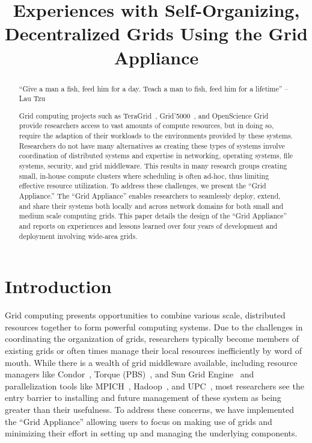 \documentclass[conference]{IEEEtran}
\begin{document}
\title{Experiences with Self-Organizing, Decentralized Grids Using the Grid
Appliance}

\author{
}

\maketitle


\begin{abstract}

``Give a man a fish, feed him for a day.  Teach a man to fish, feed him for a
lifetime'' -- Lau Tzu

Grid computing projects such as TeraGrid~\cite{teragrid},
Grid'5000~\cite{grid_5000}, and OpenScience Grid~\cite{osg} provide researchers
access to vast amounts of compute resources, but in doing so, require the
adaption of their workloads to the environments provided by these systems.
Researchers do not have many alternatives as creating these types of systems
involve coordination of distributed systems and expertise in networking,
operating systems, file systems, security, and grid middleware.  This results
in many research groups creating small, in-house compute clusters where
scheduling is often ad-hoc, thus limiting effective resource utilization.  To
address these challenges, we present the ``Grid Appliance.''  The ``Grid
Appliance'' enables researchers to seamlessly deploy, extend, and share their
systems both locally and across network domains for both small and medium scale
computing grids.  This paper details the design of the ``Grid Appliance'' and
reports on experiences and lessons learned over four years of development and
deployment involving wide-area grids.

\end{abstract}

\section{Introduction}

Grid computing presents opportunities to combine various scale, distributed
resources together to form powerful computing systems.  Due to the challenges
in coordinating the organization of grids, researchers typically become members
of existing grids or often times manage their local resources inefficiently by
word of mouth.  While there is a wealth of grid middleware available, including
resource managers like Condor~\cite{condor0}, Torque (PBS)~\cite{torque}, and
Sun Grid Engine~\cite{grid_engine} and parallelization tools like
MPICH~\cite{mpich}, Hadoop~\cite{hadoop}, and UPC~\cite{upc}, most researchers
see the entry barrier to installing and future management of these system as
being greater than their usefulness.  To address these concerns, we have
implemented the ``Grid Appliance'' allowing users to focus on making use of
grids and minimizing their effort in setting up and managing the underlying
components.
\end{document}
